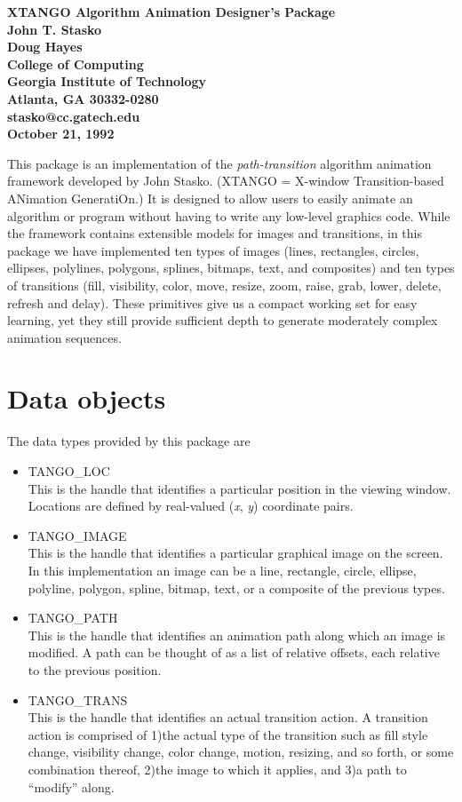 \pagestyle{myheadings}
\thispagestyle{empty}

\begin{center}
   \Large\bf  XTANGO Algorithm Animation Designer's Package\\[.2in]
\large  John T. Stasko                 \\
        Doug Hayes               \\[.2in]
        College of Computing \\
        Georgia Institute of Technology\\
        Atlanta, GA  30332-0280     \\[.2in]
        stasko@cc.gatech.edu        \\[.1in]
        October 21, 1992
\end{center}
This package is an implementation of the {\em path-transition}
algorithm animation framework developed by John Stasko.  (XTANGO =
X-window Transition-based ANimation GeneratiOn.)  It is designed to
allow users to easily animate an algorithm or program without having
to write any low-level graphics code.  While the framework contains
extensible models for images and transitions, in this package we have
implemented ten types of images (lines, rectangles, circles, ellipses,
polylines, polygons, splines, bitmaps, text, and composites) and ten
types of transitions (fill, visibility, color, move, resize, zoom, raise,
grab, lower, delete, refresh and delay). These primitives give us a
compact working set for easy learning, yet they still provide
sufficient depth to generate moderately complex animation sequences.

\section{Data objects}
The data types provided by this package are
\begin{itemize}
\item TANGO\_LOC\\
This is the handle that identifies a particular position in the viewing
window.  Locations are defined by real-valued ({\em x}, {\em y}) coordinate
pairs.
\item TANGO\_IMAGE\\
This is the handle that identifies a particular graphical image on the
screen.  In this implementation an image can be a line, rectangle,
circle, ellipse, polyline, polygon, spline, bitmap, text, or a
composite of the previous types.
\item TANGO\_PATH\\
This is the handle that identifies an animation path along which an image
is modified.  A path can be thought of as a list of relative
offsets, each relative to the previous position.
\item TANGO\_TRANS\\
This is the handle that identifies an actual transition action.  A transition
action is comprised of 1)the actual type of the transition such as fill
style change, visibility change, color change, motion, resizing, and so forth,
or some combination thereof, 2)the image to which it applies, and 3)a path to
``modify'' along.
\end{itemize}

